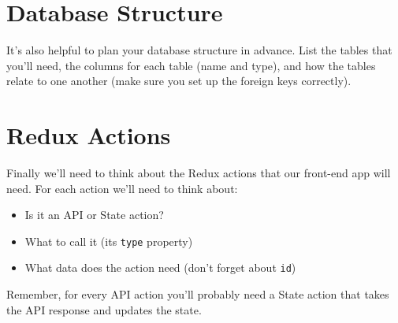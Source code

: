 \section{Database Structure}

It's also helpful to plan your database structure in advance. List the tables that you'll need, the columns for each table (name and type), and how the tables relate to one another (make sure you set up the foreign keys correctly).

\section{Redux Actions}

Finally we'll need to think about the Redux actions that our front-end app will need. For each action we'll need to think about:

\begin{itemize}
    \item Is it an API or State action?
    \item What to call it (its \texttt{type} property)
    \item What data does the action need (don't forget about \texttt{id})
\end{itemize}

Remember, for every API action you'll probably need a State action that takes the API response and updates the state.
